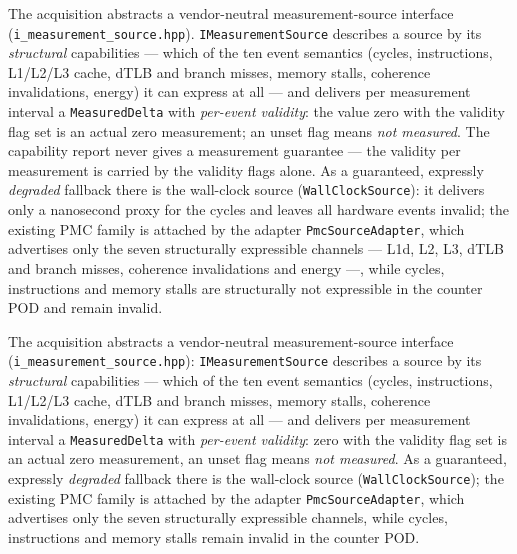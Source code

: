 \begin{nurlang}
The acquisition abstracts a vendor-neutral measurement-source interface
(\texttt{i\_\allowbreak{}measurement\_\allowbreak{}source.hpp}). \texttt{IMeasurementSource} describes
a source by its \emph{structural} capabilities --- which of the ten event semantics (cycles,
instructions, L1/L2/L3 cache, dTLB and branch misses, memory stalls, coherence invalidations, energy)
it can express at all --- and delivers per measurement interval a \texttt{MeasuredDelta} with
\emph{per-event validity}: the value zero with the validity flag set is an actual zero measurement; an
unset flag means \emph{not measured}. The capability report never gives a measurement guarantee --- the
validity per measurement is carried by the validity flags alone. As a guaranteed, expressly
\emph{degraded} fallback there is the wall-clock source (\texttt{WallClockSource}): it delivers only a
nanosecond proxy for the cycles and leaves all hardware events invalid; the existing PMC family is
attached by the adapter \texttt{PmcSourceAdapter}, which advertises only the seven structurally
expressible channels --- L1d, L2, L3, dTLB and branch misses, coherence invalidations and energy ---,
while cycles, instructions and memory stalls are structurally not expressible in the counter POD and
remain invalid.
\end{nurlang}
\begin{nurkurz}
The acquisition abstracts a vendor-neutral measurement-source interface
(\texttt{i\_\allowbreak{}measurement\_\allowbreak{}source.hpp}): \texttt{IMeasurementSource} describes
a source by its \emph{structural} capabilities --- which of the ten event semantics (cycles,
instructions, L1/L2/L3 cache, dTLB and branch misses, memory stalls, coherence invalidations, energy)
it can express at all --- and delivers per measurement interval a \texttt{MeasuredDelta} with
\emph{per-event validity}: zero with the validity flag set is an actual zero measurement, an unset flag
means \emph{not measured}. As a guaranteed, expressly \emph{degraded} fallback there is the wall-clock
source (\texttt{WallClockSource}); the existing PMC family is attached by the adapter
\texttt{PmcSourceAdapter}, which advertises only the seven structurally expressible channels, while
cycles, instructions and memory stalls remain invalid in the counter POD\@.
\end{nurkurz}


